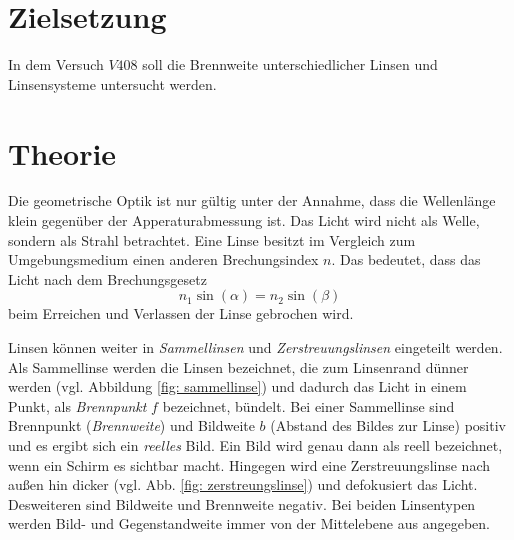 \setcounter{page}{1}
\section*{Zielsetzung}
In dem Versuch $V408$ soll die Brennweite unterschiedlicher Linsen und
Linsensysteme untersucht werden.
\section{Theorie}
Die geometrische Optik ist nur gültig unter der Annahme, dass die Wellenlänge klein
gegenüber der Apperaturabmessung ist. Das Licht wird nicht als Welle, sondern als
Strahl betrachtet.  %
Eine Linse besitzt im Vergleich zum Umgebungsmedium einen anderen Brechungsindex $n$.
Das bedeutet, dass das Licht nach dem Brechungsgesetz
\begin{equation*}
  n_1\sin(\alpha)=n_2\sin(\beta)
\end{equation*}
beim Erreichen und Verlassen der Linse gebrochen wird. %

Linsen können weiter in \emph{Sammellinsen} und \emph{Zerstreuungslinsen} %
eingeteilt werden. Als Sammellinse werden die Linsen bezeichnet, die zum Linsenrand %
dünner werden (vgl. Abbildung \ref{fig: sammellinse}) und dadurch das Licht in einem Punkt, als \emph{Brennpunkt} $f$ bezeichnet,
bündelt.
Bei einer Sammellinse sind Brennpunkt (\emph{Brennweite}) %
und Bildweite $b$ (Abstand des Bildes zur Linse) positiv und es ergibt sich ein
\emph{reelles} Bild. Ein Bild wird genau dann als reell bezeichnet, wenn
ein Schirm es sichtbar macht.
Hingegen wird eine Zerstreuungslinse nach außen hin dicker (vgl. Abb. \ref{fig: zerstreungslinse}) und
defokusiert das Licht. Desweiteren sind Bildweite und Brennweite negativ.
Bei beiden Linsentypen werden Bild- und Gegenstandweite immer von der Mittelebene
aus angegeben.


